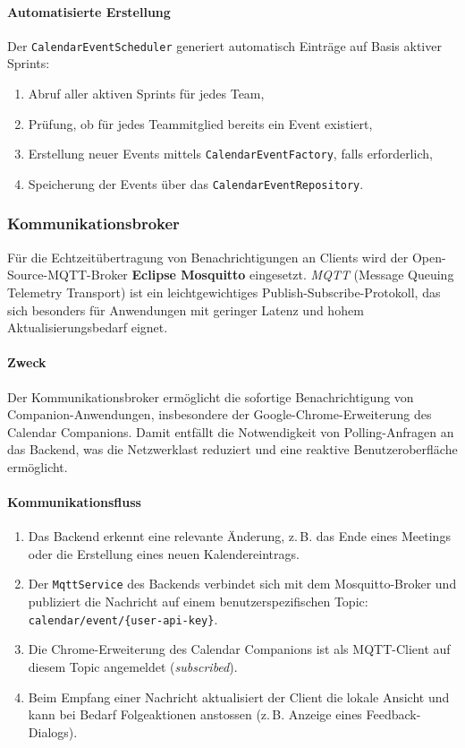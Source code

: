 \documentclass[12pt,a4paper]{report}
\begin{document}
\paragraph{Automatisierte Erstellung}
    Der \texttt{CalendarEventScheduler} generiert automatisch Einträge auf Basis aktiver Sprints:
    \begin{enumerate}
        \item Abruf aller aktiven Sprints für jedes Team,
        \item Prüfung, ob für jedes Teammitglied bereits ein Event existiert,
        \item Erstellung neuer Events mittels \texttt{CalendarEventFactory}, falls erforderlich,
        \item Speicherung der Events über das \texttt{CalendarEventRepository}.
    \end{enumerate}

\subsubsection{Kommunikationsbroker}
    Für die Echtzeitübertragung von Benachrichtigungen an Clients wird der Open-Source-MQTT-Broker \textbf{Eclipse Mosquitto} eingesetzt.
    \textit{MQTT} (Message Queuing Telemetry Transport) ist ein leichtgewichtiges Publish-Subscribe-Protokoll, das sich besonders für Anwendungen mit geringer Latenz und hohem Aktualisierungsbedarf eignet.

\paragraph{Zweck}
    Der Kommunikationsbroker ermöglicht die sofortige Benachrichtigung von Companion-Anwendungen, insbesondere der Google-Chrome-Erweiterung des Calendar Companions.
    Damit entfällt die Notwendigkeit von Polling-Anfragen an das Backend, was die Netzwerklast reduziert und eine reaktive Benutzeroberfläche ermöglicht.

\paragraph{Kommunikationsfluss}
    \begin{enumerate}
        \item Das Backend erkennt eine relevante Änderung, z.\,B. das Ende eines Meetings oder die Erstellung eines neuen Kalendereintrags.
        \item Der \texttt{MqttService} des Backends verbindet sich mit dem Mosquitto-Broker und publiziert die Nachricht auf einem benutzerspezifischen Topic:
            \texttt{calendar/event/\{user-api-key\}}.
        \item Die Chrome-Erweiterung des Calendar Companions ist als MQTT-Client auf diesem Topic angemeldet (\textit{subscribed}).
        \item Beim Empfang einer Nachricht aktualisiert der Client die lokale Ansicht und kann bei Bedarf Folgeaktionen anstossen (z.\,B. Anzeige eines Feedback-Dialogs).
    \end{enumerate}
\end{document}
